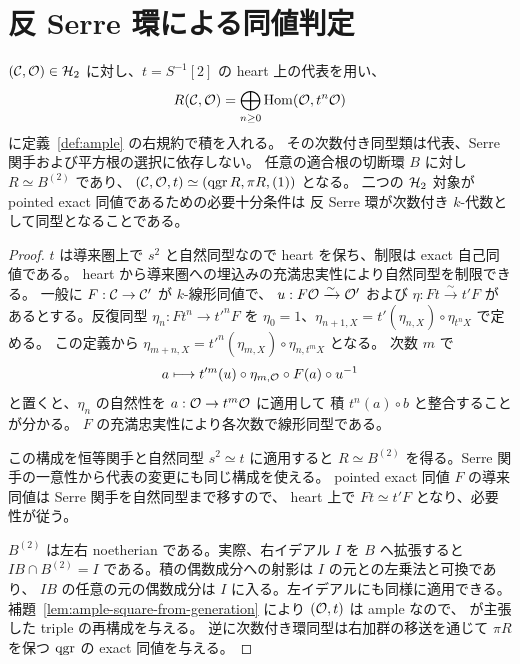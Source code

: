 \section{反 Serre 環による同値判定}
\label{sec:antiserre-ring}

\begin{theorem}
\label{thm:antiserre-invariant}
$(\mathcal C,\mathcal O)\in\mathcal H_2$ に対し、$t=S^{-1}[2]$ の heart 上の代表を用い、
\[
 R(\mathcal C,\mathcal O)=\bigoplus_{n\ge0}\operatorname{Hom}(\mathcal O,t^n\mathcal O)
\]
に定義~\ref{def:ample} の右規約で積を入れる。
その次数付き同型類は代表、Serre 関手および平方根の選択に依存しない。
任意の適合根の切断環 $B$ に対し $R\simeq B^{(2)}$ であり、
$(\mathcal C,\mathcal O,t)\simeq(\operatorname{qgr} R,\pi R,(1))$ となる。
二つの $\mathcal H_2$ 対象が pointed exact 同値であるための必要十分条件は
反 Serre 環が次数付き $k$-代数として同型となることである。
\end{theorem}

\begin{proof}
$t$ は導来圏上で $s^2$ と自然同型なので heart を保ち、制限は exact 自己同値である。
heart から導来圏への埋込みの充満忠実性により自然同型を制限できる。
一般に $F:\mathcal C\to\mathcal C'$ が $k$-線形同値で、
$u:F\mathcal O\xrightarrow{\sim}\mathcal O'$ および $\eta:Ft\xrightarrow{\sim}t'F$
があるとする。反復同型 $\eta_n:Ft^n\to t'^nF$ を
$\eta_0=1$、$\eta_{n+1,X}=t'(\eta_{n,X})\circ\eta_{t^nX}$ で定める。
この定義から
$\eta_{m+n,X}=t'^n(\eta_{m,X})\circ\eta_{n,t^mX}$ となる。
次数 $m$ で
\[
 a\longmapsto t'^m(u)\circ\eta_{m,\mathcal O}\circ F(a)\circ u^{-1}
\]
と置くと、$\eta_n$ の自然性を $a:\mathcal O\to t^m\mathcal O$ に適用して
積 $t^n(a)\circ b$ と整合することが分かる。
$F$ の充満忠実性により各次数で線形同型である。

この構成を恒等関手と自然同型 $s^2\simeq t$ に適用すると
$R\simeq B^{(2)}$ を得る。Serre 関手の一意性から代表の変更にも同じ構成を使える。
pointed exact 同値 $F$ の導来同値は Serre 関手を自然同型まで移すので、
heart 上で $Ft\simeq t'F$ となり、必要性が従う。

$B^{(2)}$ は左右 noetherian である。実際、右イデアル $I$ を $B$ へ拡張すると
$IB\cap B^{(2)}=I$ である。積の偶数成分への射影は $I$ の元との左乗法と可換であり、
$IB$ の任意の元の偶数成分は $I$ に入る。左イデアルにも同様に適用できる。
補題~\ref{lem:ample-square-from-generation} により $(\mathcal O,t)$ は ample なので、
\cite[Theorem 2.6(2)]{MU2021} が主張した triple の再構成を与える。
逆に次数付き環同型は右加群の移送を通じて $\pi R$ を保つ $\operatorname{qgr}$ の exact 同値を与える。
\end{proof}

